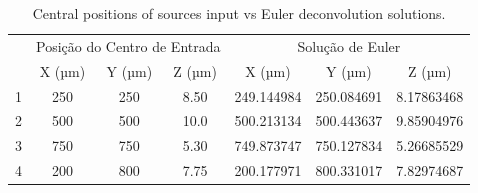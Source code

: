 \documentclass[manuscript,revised]{geophysics}
\begin{document}
\begin{table}[htbp]
\caption{Central positions of sources input vs Euler deconvolution solutions.}
\label{tab:eulerresults}
\centering
\begin{tabular}[width=1.0\textwidth]{ccccccc}
\rowcolor[HTML]{E7E7E7} 
\cellcolor[HTML]{E7E7E7}                         & \multicolumn{3}{c}{\cellcolor[HTML]{E7E7E7}Posição do Centro de   Entrada} & \multicolumn{3}{c}{\cellcolor[HTML]{E7E7E7}Solução de Euler} \\
\rowcolor[HTML]{E7E7E7} 
\multirow{-2}{*}{\cellcolor[HTML]{E7E7E7}Esfera} & X (µm)                  & Y (µm)                  & Z (µm)                 & X (µm)             & Y (µm)             & Z (µm)             \\
1                                                & 250                     & 250                     & 8.50                   & 249.144984         & 250.084691         & 8.17863468         \\
\rowcolor[HTML]{E7E7E7} 
2                                                & 500                     & 500                     & 10.0                   & 500.213134         & 500.443637         & 9.85904976         \\
3                                                & 750                     & 750                     & 5.30                   & 749.873747         & 750.127834         & 5.26685529         \\
\rowcolor[HTML]{E7E7E7} 
4                                                & 200                     & 800                     & 7.75                   & 200.177971         & 800.331017         & 7.82974687        
\end{tabular}
\end{table}
\end{document}
